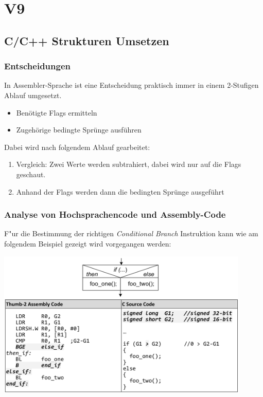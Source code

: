 \section{V9}
\subsection{C/C++ Strukturen Umsetzen}
\subsubsection{Entscheidungen}
In Assembler-Sprache ist eine Entscheidung praktisch immer in einem 2-Stufigen Ablauf umgesetzt.
\begin{itemize}
    \item Benötigte Flags ermitteln
    \item Zugehörige bedingte Sprünge ausführen
\end{itemize}

Dabei wird nach folgendem Ablauf gearbeitet:\\
\vspace{-0.5cm}
\begin{enumerate}
    \item Vergleich: Zwei Werte werden subtrahiert, dabei wird nur auf die Flags geschaut.
    \item Anhand der Flags werden dann die bedingten Sprünge ausgeführt
\end{enumerate}

\subsubsection{Analyse von Hochsprachencode und Assembly-Code}
F"ur die Bestimmung der richtigen \textit{Conditional Branch} Instruktion kann wie am folgendem Beispiel gezeigt wird vorgegangen werden:

\begin{center}
	\includegraphics[width=12cm]{images/Bsp_cpp-assembly}
\end{center}

